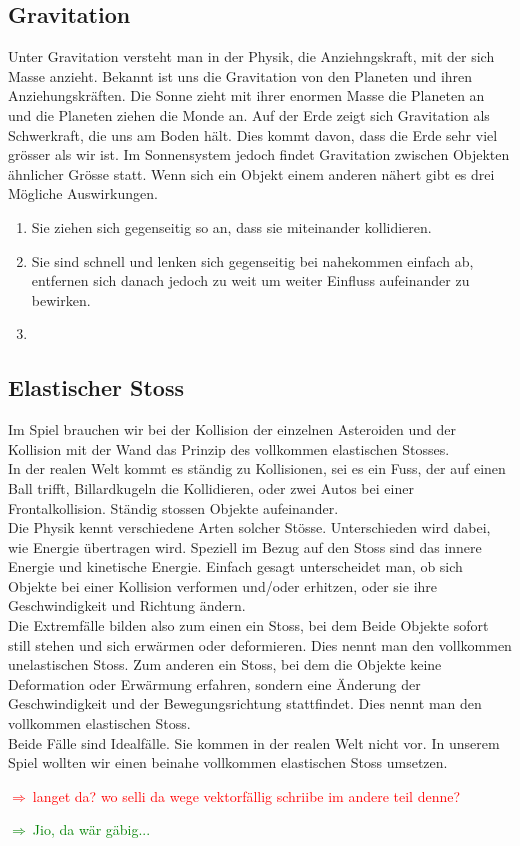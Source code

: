 \documentclass[12pt,a4paper]{scrartcl}
\newcommand{\todo}[1]{\begin{Large}\textcolor{red}{$\Rightarrow ~$#1}\end{Large}}
\newcommand{\ant}[1]{\begin{Large}\textcolor{green}{$\Rightarrow ~$#1}\end{Large}}
\begin{document}
\subsection{Gravitation}
Unter Gravitation versteht man in der Physik, die Anziehngskraft, mit der sich Masse anzieht.
Bekannt ist uns die Gravitation von den Planeten und ihren Anziehungskräften.
Die Sonne zieht mit ihrer enormen Masse die Planeten an und die Planeten ziehen die Monde an.
Auf der Erde zeigt sich Gravitation als Schwerkraft, die uns am Boden hält.
Dies kommt davon, dass die Erde sehr viel grösser als wir ist.
Im Sonnensystem jedoch findet Gravitation zwischen Objekten ähnlicher Grösse statt.
Wenn sich ein Objekt einem anderen nähert gibt es drei Mögliche Auswirkungen.
\begin{enumerate}
\item Sie ziehen sich gegenseitig so an, dass sie miteinander kollidieren.
\item Sie sind schnell und lenken sich gegenseitig bei nahekommen einfach ab, entfernen sich danach jedoch zu weit um weiter Einfluss aufeinander zu bewirken.
\item 

\end{enumerate}


\subsection{Elastischer Stoss}
Im Spiel brauchen wir bei der Kollision der einzelnen Asteroiden und der Kollision mit der Wand das Prinzip des vollkommen elastischen Stosses. \\
In der realen Welt kommt es ständig zu Kollisionen, sei es ein Fuss, der auf einen Ball trifft, Billardkugeln die Kollidieren, oder zwei Autos bei einer Frontalkollision. 
Ständig stossen Objekte aufeinander. \\
Die Physik kennt verschiedene Arten solcher Stösse.
Unterschieden wird dabei, wie Energie übertragen wird.
Speziell im Bezug auf den Stoss sind das innere Energie und kinetische Energie.
Einfach gesagt unterscheidet man, ob sich Objekte bei einer Kollision verformen und/oder erhitzen, oder sie ihre Geschwindigkeit und Richtung ändern.\\
Die Extremfälle bilden also zum einen ein Stoss, bei dem Beide Objekte sofort still stehen und sich erwärmen oder deformieren.
Dies nennt man den vollkommen unelastischen Stoss.
Zum anderen ein Stoss, bei dem die Objekte keine Deformation oder Erwärmung erfahren, sondern eine Änderung der Geschwindigkeit und der Bewegungsrichtung stattfindet.
Dies nennt man den vollkommen elastischen Stoss.\\
Beide Fälle sind Idealfälle.
Sie kommen in der realen Welt nicht vor.
In unserem Spiel wollten wir einen beinahe vollkommen elastischen Stoss umsetzen.
\todo{langet da? wo selli da wege vektorfällig schriibe im andere teil denne?}
\ant{Jio, da wär gäbig...}
\end{document}
